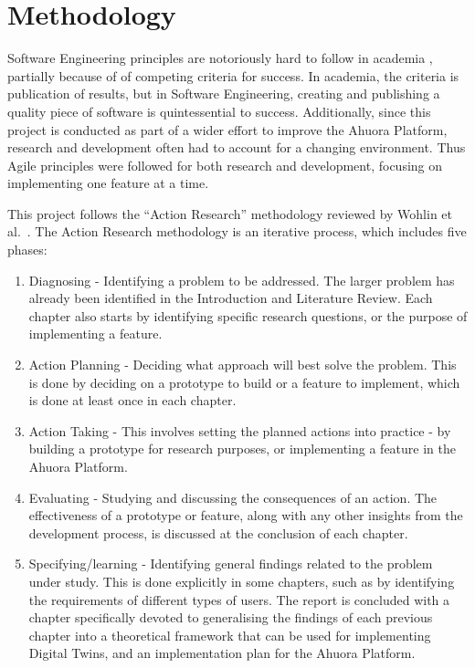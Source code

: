 \chapter{Methodology}

Software Engineering principles are notoriously hard to follow in academia \cite{connolly2023software}, partially because of of competing criteria for success. 
In academia, the criteria is publication of results, but in Software Engineering, creating and publishing a quality piece of software is quintessential to success. 
Additionally, since this project is conducted as part of a wider effort to improve the Ahuora Platform, research and development often had to account for a changing environment. 
Thus Agile principles were followed for both research and development, focusing on implementing one feature at a time. 

This project follows the ``Action Research'' methodology reviewed by Wohlin et al.~\cite{wohlin2021guiding}. The Action Research methodology is an iterative process, which includes five phases:

\begin{enumerate}
    \item Diagnosing - Identifying a problem to be addressed. The larger problem has already been identified in the Introduction and Literature Review. Each chapter also starts by identifying specific research questions, or the purpose of implementing a feature.
    \item Action Planning - Deciding what approach will best solve the problem. This is done by deciding on a prototype to build or a feature to implement, which is done at least once in each chapter.
    \item Action Taking - This involves setting the planned actions into practice - by building a prototype for research purposes, or implementing a feature in the Ahuora Platform.
    \item Evaluating - Studying and discussing the consequences of an action. The effectiveness of a prototype or feature, along with any other insights from the development process, is discussed at the conclusion of each chapter.
    \item Specifying/learning - Identifying general findings related to the problem under study. This is done explicitly in some chapters, such as by identifying the requirements of different types of users. The report is concluded with a chapter specifically devoted to generalising the findings of each previous chapter into a theoretical framework that can be used for implementing Digital Twins, and an implementation plan for the Ahuora Platform. 
\end{enumerate}


